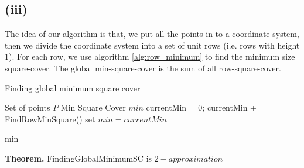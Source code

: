 \subsection*{(iii)}
\label{a-1-3-3}

The idea of our algorithm is that, we put all the points in to a coordinate system, then we divide the coordinate system into a set of unit rows (i.e. rows with height 1). For each row, we use algorithm \ref{alg:row_minimum} to find the minimum size square-cover. The global min-square-cover is the sum of all row-square-cover.

\begin{algorithm}
  \caption{Finding global minimum square cover}
  \label{alg:global_minimum}
  \begin{algorithmic}
    \renewcommand{\algorithmicrequire}{\textbf{Input:}}
    \renewcommand{\algorithmicensure}{\textbf{Output:}}
    \algnewcommand{}
    \algnewcommand\Operation{\item[\algorithmicoperation]}
    \Require Set of points $P$
    \Ensure Min Square Cover $min$
    \Operation
    \State currentMin = 0;
    \State currentMin += FindRowMinSquare()
    \EndFor
    \State set $min = currentMin$
    
    \Return min
  \end{algorithmic}
\end{algorithm}

\textbf{Theorem.} FindingGlobalMinimumSC is $2-approximation$

